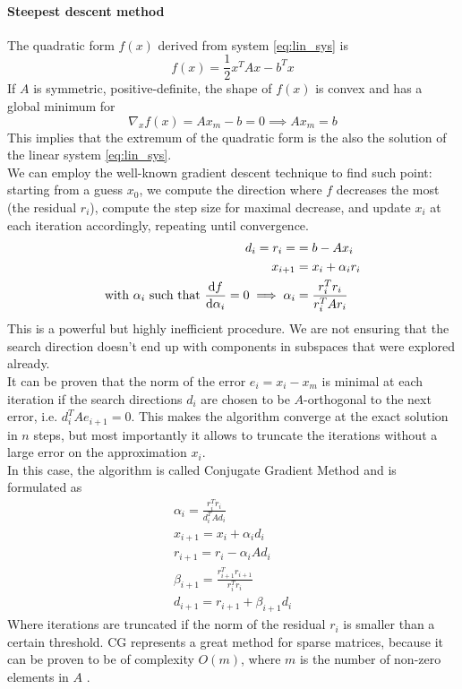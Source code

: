 \paragraph{Steepest descent method}
The quadratic form $f(x)$ derived from system \ref{eq:lin_sys} is
\begin{equation}
    \label{eq:quad_form}
    f(x) = \frac 1 2 x^T A x - b^T x
\end{equation}
If $A$ is symmetric, positive-definite, the shape of $f(x)$ is convex and has a global minimum for
\begin{equation}
    \label{eq:quad_form_min}
    \nabla_x f(x) = A x_m - b = 0 \implies A x_m = b
\end{equation}
This implies that the extremum of the quadratic form is the also the solution of the linear system \ref{eq:lin_sys}.
\\We can employ the well-known gradient descent technique \cite{PainlessCGM} to find such point: starting from a guess $x_0$, we compute the direction where $f$ decreases the most (the residual $r_i$), compute the step size for maximal decrease, and update $x_i$ at each iteration accordingly, repeating until convergence.
\begin{align}
d_i = r_i =&= b - A x_i \\
x_{i+1} &= x_i +\alpha_i r_i \\
\text{with } \alpha_i \text{ such that } \dv{f}{\alpha_i} = 0 \implies \alpha_i &= \frac{r_i^T r_i}{r_i^T A r_i}
\end{align}
This is a powerful but highly inefficient procedure. We are not ensuring that the search direction doesn't end up with components in subspaces that were explored already.
\\It can be proven \cite{PainlessCGM} that the norm of the error $e_i = x_i - x_m$ is minimal at each iteration if the search directions $d_i$ are chosen to be $A$-orthogonal to the next error, i.e. $d_i^T A e_{i+1} = 0$. This makes the algorithm converge at the exact solution in $n$ steps, but most importantly it allows to truncate the iterations without a large error on the approximation $x_i$.
\\In this case, the algorithm is called Conjugate Gradient Method and is formulated as 
\begin{align}
    \label{eq:cg_method}
    \alpha_i = \frac{r_i^T r_i}{d_i^T A d_i}  
    \\x_{i+1} = x_i + \alpha_i d_i
    \\r_{i+1} = r_i - \alpha_i A d_i
    \\\beta_{i+1} = \frac{r_{i+1}^T r_{i+1}}{r_i^T r_i}
    \\d_{i+1} = r_{i+1} + \beta_{i+1} d_i
\end{align}
Where iterations are truncated if the norm of the residual $r_i$ is smaller than a certain threshold.
CG represents a great method for sparse matrices, because it can be proven to be of complexity $O(m)$, where $m$ is the number of non-zero elements in $A$ \cite{PainlessCGM}.
